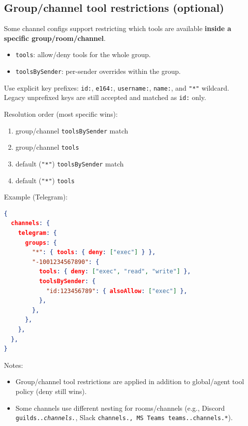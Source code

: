 \subsection{Group/channel tool restrictions (optional)}


Some channel configs support restricting which tools are available \textbf{inside a specific group/room/channel}.

\begin{itemize}
  \item \texttt{tools}: allow/deny tools for the whole group.
  \item \texttt{toolsBySender}: per-sender overrides within the group.
\end{itemize}

Use explicit key prefixes:
\texttt{id:}, \texttt{e164:}, \texttt{username:}, \texttt{name:}, and \texttt{"*"} wildcard.
Legacy unprefixed keys are still accepted and matched as \texttt{id:} only.

Resolution order (most specific wins):

\begin{enumerate}
  \item group/channel \texttt{toolsBySender} match
  \item group/channel \texttt{tools}
  \item default (\texttt{"*"}) \texttt{toolsBySender} match
  \item default (\texttt{"*"}) \texttt{tools}
\end{enumerate}


Example (Telegram):

\begin{lstlisting}[language=json]
{
  channels: {
    telegram: {
      groups: {
        "*": { tools: { deny: ["exec"] } },
        "-1001234567890": {
          tools: { deny: ["exec", "read", "write"] },
          toolsBySender: {
            "id:123456789": { alsoAllow: ["exec"] },
          },
        },
      },
    },
  },
}
\end{lstlisting}


Notes:

\begin{itemize}
  \item Group/channel tool restrictions are applied in addition to global/agent tool policy (deny still wins).
  \item Some channels use different nesting for rooms/channels (e.g., Discord \texttt{guilds.\textit{.channels.}}, Slack \texttt{channels.\textit{}, MS Teams \texttt{teams.}.channels.*}).
\end{itemize}



